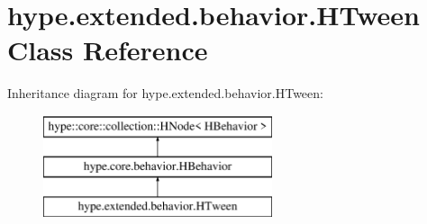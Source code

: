 \hypertarget{classhype_1_1extended_1_1behavior_1_1_h_tween}{\section{hype.\-extended.\-behavior.\-H\-Tween Class Reference}
\label{classhype_1_1extended_1_1behavior_1_1_h_tween}
}
Inheritance diagram for hype.\-extended.\-behavior.\-H\-Tween\-:\begin{figure}[H]
\begin{center}
\leavevmode
\includegraphics[height=3.000000cm]{classhype_1_1extended_1_1behavior_1_1_h_tween}
\end{center}
\end{figure}
